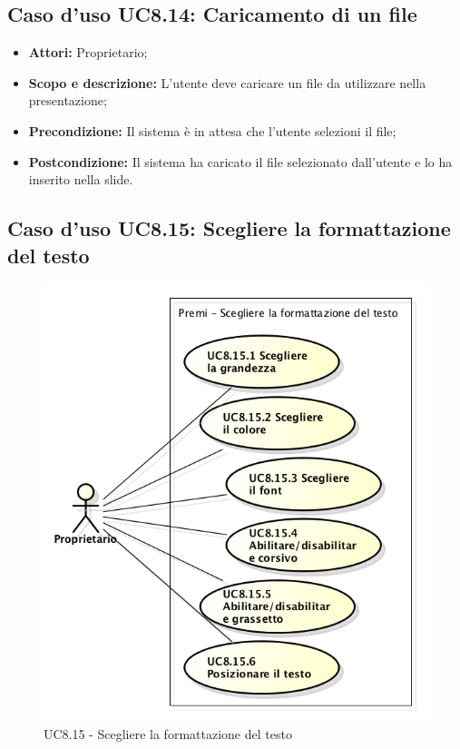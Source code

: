 \subsection{Caso d'uso UC8.14: Caricamento di un file}
\begin{itemize}
	\item \textbf{Attori:} Proprietario;
	\item \textbf{Scopo e descrizione:} L'utente deve caricare un file da utilizzare nella presentazione;
	\item \textbf{Precondizione:} Il sistema è in attesa che l'utente selezioni il file;
	\item \textbf{Postcondizione:} Il sistema ha caricato il file selezionato dall'utente e lo ha inserito nella slide.
\end{itemize}


\subsection{Caso d'uso UC8.15: Scegliere la formattazione del testo}
\begin{figure}[h] 
	\centering 
	\includegraphics[scale=0.45] {img/UC8.15.png} 
	\caption{UC8.15 - Scegliere la formattazione del testo}
\end{figure}

